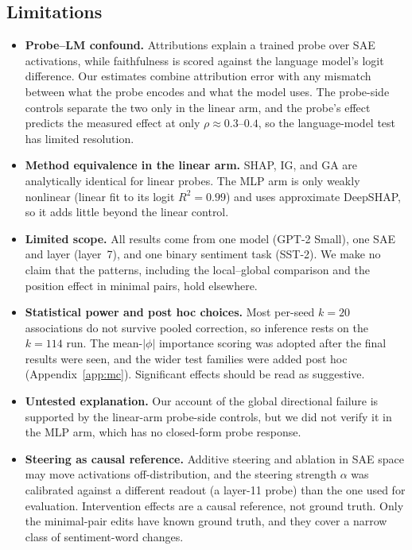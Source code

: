 \subsection{Limitations}
\begin{itemize}
    \item \textbf{Probe--LM confound.} Attributions explain a trained probe over SAE activations, while faithfulness is scored against the language model's logit difference. Our estimates combine attribution error with any mismatch between what the probe encodes and what the model uses. The probe-side controls separate the two only in the linear arm, and the probe's effect predicts the measured effect at only $\rho \approx 0.3$--$0.4$, so the language-model test has limited resolution.
    \item \textbf{Method equivalence in the linear arm.} SHAP, IG, and GA are analytically identical for linear probes. The MLP arm is only weakly nonlinear (linear fit to its logit $R^2 = 0.99$) and uses approximate DeepSHAP, so it adds little beyond the linear control.
    \item \textbf{Limited scope.} All results come from one model (GPT-2 Small), one SAE and layer (layer~7), and one binary sentiment task (SST-2). We make no claim that the patterns, including the local--global comparison and the position effect in minimal pairs, hold elsewhere.
    \item \textbf{Statistical power and post hoc choices.} Most per-seed $k = 20$ associations do not survive pooled correction, so inference rests on the $k = 114$ run. The mean-$|\phi|$ importance scoring was adopted after the final results were seen, and the wider test families were added post hoc (Appendix~\ref{app:mc}). Significant effects should be read as suggestive.
    \item \textbf{Untested explanation.} Our account of the global directional failure is supported by the linear-arm probe-side controls, but we did not verify it in the MLP arm, which has no closed-form probe response.
    \item \textbf{Steering as causal reference.} Additive steering and ablation in SAE space may move activations off-distribution, and the steering strength $\alpha$ was calibrated against a different readout (a layer-11 probe) than the one used for evaluation. Intervention effects are a causal reference, not ground truth. Only the minimal-pair edits have known ground truth, and they cover a narrow class of sentiment-word changes.
\end{itemize}

